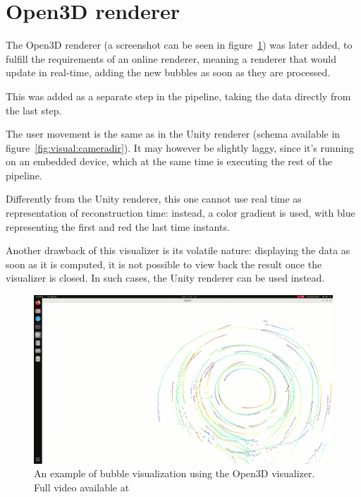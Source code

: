 \section{Open3D renderer}
\label{sec:visual:o3d}

The Open3D renderer (a screenshot can be seen in figure~\ref{sec:visual:o3d}) was later added, to fulfill the requirements of an online renderer, meaning a renderer that would update in real-time, adding the new bubbles as soon as they are processed.

This was added as a separate step in the pipeline, taking the data directly from the last step.

The user movement is the same as in the Unity renderer (schema available in figure~\ref{fig:visual:cameradir}).
It may however be slightly laggy, since it's running on an embedded device, which at the same time is executing the rest of the pipeline.

Differently from the Unity renderer, this one cannot use real time as representation of reconstruction time: instead, a color gradient is used, with blue representing the first and red the last time instants.

Another drawback of this visualizer is its volatile nature: displaying the data as soon as it is computed, it is not possible to view back the result once the visualizer is closed.
In such cases, the Unity renderer can be used instead.

\begin{figure}
	\centerline{\includegraphics[width=\locateimgsize]{images/visual/o3d.png}}
	\caption{\centering An example of bubble visualization using the Open3D visualizer. Full video available at~\cite{visual-o3d}}
	\label{fig:visual:o3d}
\end{figure}
